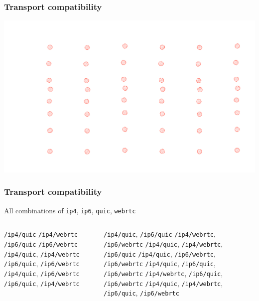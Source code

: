 \documentclass{../shipyard-slide}
\begin{document}
\begin{frame}
\frametitle{Transport compatibility}

\hspace{1.2cm}\includegraphics[scale=.13]{resources/rt5-0.png}
\end{frame}

\begin{frame}
\frametitle{Transport compatibility}

All combinations of \texttt{ip4}, \texttt{ip6}, \texttt{quic}, \texttt{webrtc}

\begin{columns}[onlytextwidth]
\begin{column}{0.38\textwidth}
\begin{itemize}
	\itemc \texttt{/ip4/quic}
	\itemc \texttt{/ip4/webrtc}
	\itemc \texttt{/ip6/quic}
	\itemc \texttt{/ip6/webrtc}
	\itemc \texttt{/ip4/quic}, \texttt{/ip4/webrtc}
	\itemc \texttt{/ip6/quic}, \texttt{/ip6/webrtc}
	\itemc \texttt{/ip4/quic}, \texttt{/ip6/webrtc}
	\itemc \texttt{/ip6/quic}, \texttt{/ip4/webrtc}
\end{itemize}
\end{column}
\begin{column}{0.58\textwidth}
\begin{itemize}
	\itemc \texttt{/ip4/quic}, \texttt{/ip6/quic}
	\itemc \texttt{/ip4/webrtc}, \texttt{/ip6/webrtc}
	\itemc \texttt{/ip4/quic}, \texttt{/ip4/webrtc}, \texttt{/ip6/quic}
	\itemc \texttt{/ip4/quic}, \texttt{/ip6/webrtc}, \texttt{/ip6/webrtc}
	\itemc \texttt{/ip4/quic}, \texttt{/ip6/quic}, \texttt{/ip6/webrtc}
	\itemc \texttt{/ip4/webrtc}, \texttt{/ip6/quic}, \texttt{/ip6/webrtc}
	\itemc \texttt{/ip4/quic}, \texttt{/ip4/webrtc}, \texttt{/ip6/quic}, \texttt{/ip6/webrtc}
\end{itemize}
\end{column}
\end{columns}
\end{frame}
\end{document}
